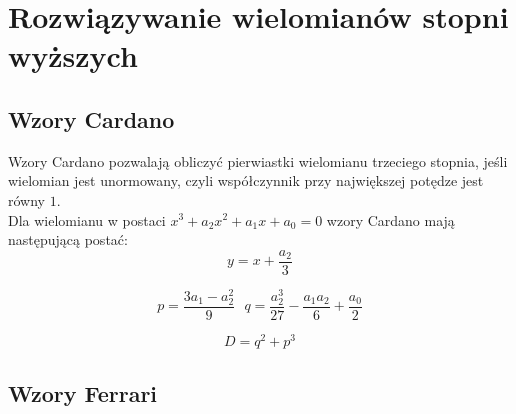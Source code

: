 \section*{Rozwiązywanie wielomianów stopni wyższych}
\subsection*{Wzory Cardano}
Wzory Cardano pozwalają obliczyć pierwiastki wielomianu trzeciego stopnia,
jeśli wielomian jest unormowany, czyli współczynnik przy największej
potędze jest równy $1$.\\
Dla wielomianu w postaci $x^3 + a_2x^2 + a_1x + a_0 = 0$ wzory
Cardano mają następującą postać:
\begin{equation*}
    y = x + \frac{a_2}{3}
\end{equation*}

\begin{equation*}
    p = \frac{3a_1 - a_2^2}{9}\ \ \ 
    q = \frac{a_2^3}{27} - \frac{a_1 a_2}{6} + \frac{a_0}{2}
\end{equation*}

\begin{equation*}
    D = q^2 + p^3
\end{equation*}

\subsection*{Wzory Ferrari}